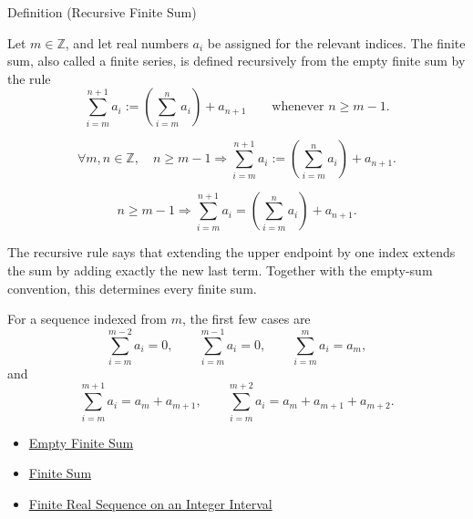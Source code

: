 \begin{definitionbox}{Definition (Recursive Finite Sum)}
\begin{definition}
\label{def:recursive-finite-sum}

Let \(m \in \mathbb{Z}\), and let real numbers \(a_i\) be assigned for
the relevant indices. The finite sum, also called a finite series, is
defined recursively from the empty finite sum by the rule
\[
  \sum_{i=m}^{n+1} a_i
  :=
  \left(\sum_{i=m}^{n} a_i\right) + a_{n+1}
  \qquad \text{whenever } n \ge m-1.
\]
\end{definition}
\end{definitionbox}

\begin{remark*}
\[
  \forall m,n \in \mathbb{Z},\quad
  n \ge m-1
  \Longrightarrow
  \sum_{i=m}^{n+1} a_i
  :=
  \left(\sum_{i=m}^{n} a_i\right)+a_{n+1}.
\]
\end{remark*}

\begin{remark*}
\[
  n\ge m-1
  \Longrightarrow
  \sum_{i=m}^{n+1}a_i
  =
  \left(\sum_{i=m}^{n}a_i\right)+a_{n+1}.
\]
\end{remark*}

\begin{remark*}[Interpretation]
The recursive rule says that extending the upper endpoint by one index
extends the sum by adding exactly the new last term. Together with the
empty-sum convention, this determines every finite sum.


For a sequence indexed from \(m\), the first few cases are
\[
  \sum_{i=m}^{m-2} a_i = 0,\qquad
  \sum_{i=m}^{m-1} a_i = 0,\qquad
  \sum_{i=m}^{m} a_i = a_m,
\]
and
\[
  \sum_{i=m}^{m+1} a_i = a_m+a_{m+1},\qquad
  \sum_{i=m}^{m+2} a_i = a_m+a_{m+1}+a_{m+2}.
\]
\end{remark*}

\begin{dependencies}
\begin{itemize}
  \item \hyperref[def:empty-finite-sum]{Empty Finite Sum}
  \item \hyperref[def:finite-sum]{Finite Sum}
  \item \hyperref[def:finite-real-sequence-integer-interval]{Finite Real Sequence on an Integer Interval}
\end{itemize}
\end{dependencies}

